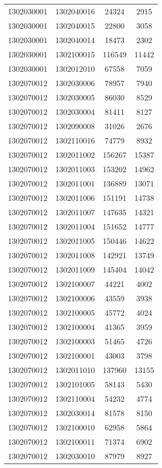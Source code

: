 \begin{longtable}[h]{llcc}
		1302030001 & 1302040016 & 24324 & 2915\\
		1302030001 & 1302040015 & 22800 & 3058\\
		1302030001 & 1302040014 & 18473 & 2302\\
		1302030001 & 1302100015 & 116549 & 11442\\
		1302030001 & 1302012010 & 67558 & 7059\\
		1302070012 & 1302030006 & 78957 & 7940\\
		1302070012 & 1302030005 & 86030 & 8529\\
		1302070012 & 1302030004 & 81411 & 8127\\
		1302070012 & 1302090008 & 31026 & 2676\\
		1302070012 & 1302110016 & 74779 & 8932\\
		1302070012 & 1302011002 & 156267 & 15387\\
		1302070012 & 1302011003 & 153202 & 14962\\
		1302070012 & 1302011001 & 136889 & 13071\\
		1302070012 & 1302011006 & 151191 & 14738\\
		1302070012 & 1302011007 & 147635 & 14321\\
		1302070012 & 1302011004 & 151652 & 14777\\
		1302070012 & 1302011005 & 150446 & 14622\\
		1302070012 & 1302011008 & 142921 & 13749\\
		1302070012 & 1302011009 & 145404 & 14042\\
		1302070012 & 1302100007 & 44221 & 4002\\
		1302070012 & 1302100006 & 43559 & 3938\\
		1302070012 & 1302100005 & 45772 & 4024\\
		1302070012 & 1302100004 & 41365 & 3959\\
		1302070012 & 1302100003 & 51465 & 4726\\
		1302070012 & 1302100001 & 43003 & 3798\\
		1302070012 & 1302011010 & 137960 & 13155\\
		1302070012 & 1302101005 & 58143 & 5430\\
		1302070012 & 1302110004 & 54232 & 4774\\
		1302070012 & 1302030014 & 81578 & 8150\\
		1302070012 & 1302100010 & 62958 & 5864\\
		1302070012 & 1302100011 & 71374 & 6902\\
		1302070012 & 1302030010 & 87979 & 8927\\

\end{longtable}
